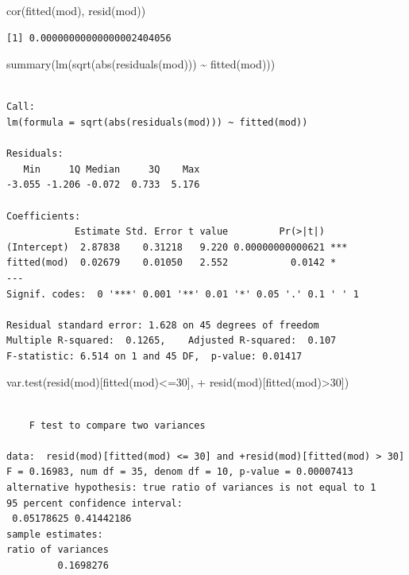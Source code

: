 \documentclass[
  letterpaper,
  DIV=11,
  numbers=noendperiod]{scrartcl}
\newenvironment{Shaded}{\begin{snugshade}}{\end{snugshade}}
\newcommand{\DecValTok}[1]{\textcolor[rgb]{0.68,0.00,0.00}{#1}}
\newcommand{\FunctionTok}[1]{\textcolor[rgb]{0.28,0.35,0.67}{#1}}
\newcommand{\NormalTok}[1]{\textcolor[rgb]{0.00,0.23,0.31}{#1}}
\newcommand{\SpecialCharTok}[1]{\textcolor[rgb]{0.37,0.37,0.37}{#1}}
\begin{document}
\begin{Shaded}
\begin{Highlighting}[]
\FunctionTok{cor}\NormalTok{(}\FunctionTok{fitted}\NormalTok{(mod), }\FunctionTok{resid}\NormalTok{(mod))}
\end{Highlighting}
\end{Shaded}

\begin{verbatim}
[1] 0.00000000000000002404056
\end{verbatim}

\begin{Shaded}
\begin{Highlighting}[]
\FunctionTok{summary}\NormalTok{(}\FunctionTok{lm}\NormalTok{(}\FunctionTok{sqrt}\NormalTok{(}\FunctionTok{abs}\NormalTok{(}\FunctionTok{residuals}\NormalTok{(mod))) }\SpecialCharTok{\textasciitilde{}} \FunctionTok{fitted}\NormalTok{(mod)))}
\end{Highlighting}
\end{Shaded}

\begin{verbatim}

Call:
lm(formula = sqrt(abs(residuals(mod))) ~ fitted(mod))

Residuals:
   Min     1Q Median     3Q    Max 
-3.055 -1.206 -0.072  0.733  5.176 

Coefficients:
            Estimate Std. Error t value         Pr(>|t|)    
(Intercept)  2.87838    0.31218   9.220 0.00000000000621 ***
fitted(mod)  0.02679    0.01050   2.552           0.0142 *  
---
Signif. codes:  0 '***' 0.001 '**' 0.01 '*' 0.05 '.' 0.1 ' ' 1

Residual standard error: 1.628 on 45 degrees of freedom
Multiple R-squared:  0.1265,    Adjusted R-squared:  0.107 
F-statistic: 6.514 on 1 and 45 DF,  p-value: 0.01417
\end{verbatim}

\begin{Shaded}
\begin{Highlighting}[]
\FunctionTok{var.test}\NormalTok{(}\FunctionTok{resid}\NormalTok{(mod)[}\FunctionTok{fitted}\NormalTok{(mod)}\SpecialCharTok{\textless{}=}\DecValTok{30}\NormalTok{],}
\SpecialCharTok{+}          \FunctionTok{resid}\NormalTok{(mod)[}\FunctionTok{fitted}\NormalTok{(mod)}\SpecialCharTok{\textgreater{}}\DecValTok{30}\NormalTok{])}
\end{Highlighting}
\end{Shaded}

\begin{verbatim}

    F test to compare two variances

data:  resid(mod)[fitted(mod) <= 30] and +resid(mod)[fitted(mod) > 30]
F = 0.16983, num df = 35, denom df = 10, p-value = 0.00007413
alternative hypothesis: true ratio of variances is not equal to 1
95 percent confidence interval:
 0.05178625 0.41442186
sample estimates:
ratio of variances 
         0.1698276 
\end{verbatim}
\end{document}
